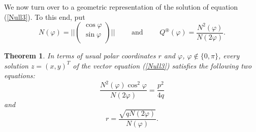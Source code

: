 \documentclass{amsart}
\newtheorem{thm}{Theorem}[section]
\theoremstyle{definition}
\theoremstyle{remark}
\numberwithin{equation}{section}
\begin{document}
We now turn over to a geometric representation of the solution of equation (\ref{Null3}). To this end, put \[N(\varphi)=||\left(
                    \begin{array}{c}
                      \cos\varphi \\
                      \sin\varphi \\
                    \end{array}
                  \right)
   || \qquad\text{ and }\qquad Q^{\circledast}(\varphi)=\frac{N^2(\varphi)}{N(2\varphi)}.\]
\begin{thm}
In terms of usual polar coordinates $r$ and $\varphi$, $\varphi \notin \{0,\pi\}$, every  solution $z=(x,y)^T$ of the vector equation (\ref{Null3}) satisfies the following two equations:
\begin{equation}\label{4.5}
\frac{N^2(\varphi)\cos^2\varphi}{N(2\varphi)}=\frac{p^2}{4q}
\end{equation}
and
\begin{equation}\label{4.6}r=\frac{\sqrt{q N(2\varphi)}}{N(\varphi)}.
\end{equation}
\end{thm}
\end{document}
